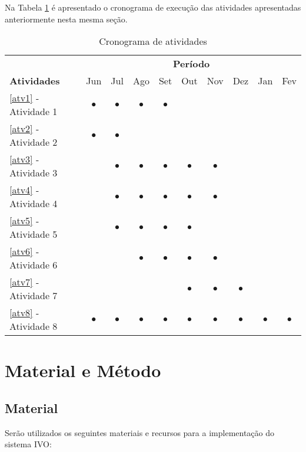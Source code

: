 \documentclass[
	12pt,				%
	a4paper,			%
	english,			%
	brazil,				%
	]{article}
\begin{document}
Na Tabela \ref{tabela:cronograma} é apresentado o cronograma de execução das atividades apresentadas anteriormente nesta mesma seção.
 
\begin{table}[ht]
	\scriptsize
	\centering
	\caption{Cronograma de atividades}
	\label{tabela:cronograma}
	\begin{tabular}{|l|c|c|c|c|c|c|c|c|c|}
		\hline &  \multicolumn{9}{|c|}{\textbf{Período}} \\ \cline{2-10}
		\textbf{Atividades} & Jun & Jul & Ago & Set & Out & Nov & Dez & Jan & Fev \\ \hline \hline
		\ref{atv1} - Atividade 1 & $\bullet$ & $\bullet$ & $\bullet$ & $\bullet$ & & & & & \\ \hline
		\ref{atv2} - Atividade 2 & $\bullet$ & $\bullet$ & & & & & & & \\ \hline
		\ref{atv3} - Atividade 3 & & $\bullet$ & $\bullet$ & $\bullet$ & $\bullet$ & $\bullet$ & & & \\ \hline
		\ref{atv4} - Atividade 4 & & $\bullet$ & $\bullet$ & $\bullet$ & $\bullet$ & $\bullet$ & & & \\ \hline
		\ref{atv5} - Atividade 5 & & $\bullet$ & $\bullet$ & $\bullet$ & $\bullet$ & & & & \\ \hline
		\ref{atv6} - Atividade 6 & & & $\bullet$ & $\bullet$ & $\bullet$ & $\bullet$ & & & \\ \hline
		\ref{atv7} - Atividade 7 & & & & & $\bullet$ & $\bullet$ & $\bullet$ &  &  \\ \hline
		\ref{atv8} - Atividade 8 & $\bullet$ & $\bullet$ & $\bullet$ & $\bullet$ & $\bullet$ & $\bullet$ & $\bullet$ & $\bullet$ & $\bullet$ \\ \hline
	\end{tabular}
\end{table}


\section{Material e Método}

\subsection{Material}

Serão utilizados os seguintes materiais e recursos para a implementação do sistema IVO:
\end{document}
